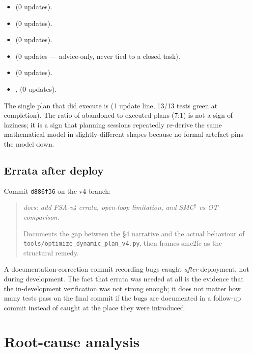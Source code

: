 \documentclass[11pt,a4paper]{article}
\begin{document}
\begin{itemize}\small
  \item {} (0 updates).
  \item {} (0 updates).
  \item {} (0 updates).
  \item {} (0 updates --- advice-only, never tied to a closed task).
  \item {} (0 updates).
  \item {},  (0 updates).
\end{itemize}

The single plan that did execute is
(1 update line, 13/13 tests green at completion). The ratio of
abandoned to executed plans (7:1) is not a sign of laziness; it is
a sign that planning sessions repeatedly re-derive the same
mathematical model in slightly-different shapes because no formal
artefact pins the model down.

\subsection{Errata after deploy}
\label{sec:errata}

Commit \texttt{d886f36} on the v4 branch:
\begin{quote}\itshape
docs: add FSA-v4 errata, open-loop limitation, and SMC$^2$ vs OT
comparison.

Documents the gap between the §4 narrative and the actual behaviour
of \texttt{tools/optimize\_dynamic\_plan\_v4.py}, then frames smc2fc
as the structural remedy.
\end{quote}
A documentation-correction commit recording bugs caught
\emph{after} deployment, not during development. The fact that
errata was needed at all is the evidence that the in-development
verification was not strong enough; it does not matter how many
tests pass on the final commit if the bugs are documented in a
follow-up commit instead of caught at the place they were
introduced.

\section{Root-cause analysis}
\label{sec:rca-lean4}
\end{document}

